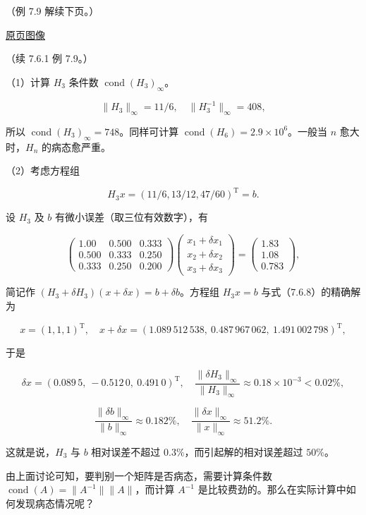 \documentclass[
  10pt,
  fontset=fandol]{ctexart}
\begin{document}
（例 7.9 解续下页。）

\href{../../source-images/pdf-208.jpeg}{原页图像}

（续 7.6.1 例 7.9。）

（1）计算 \(H_3\) 条件数 \(\operatorname{cond}(H_3)_\infty\)。

\[
\|H_3\|_\infty=11/6,\quad\|H_3^{-1}\|_\infty=408,
\]

所以 \(\operatorname{cond}(H_3)_\infty=748\)。同样可计算 \(\operatorname{cond}(H_6)=2.9\times10^6\)。一般当 \(n\) 愈大时，\(H_n\) 的病态愈严重。

（2）考虑方程组

\[
H_3x=(11/6,13/12,47/60)^{\mathrm T}=b.
\]

设 \(H_3\) 及 \(b\) 有微小误差（取三位有效数字），有

\[
\begin{pmatrix}
1.00&0.500&0.333\\
0.500&0.333&0.250\\
0.333&0.250&0.200
\end{pmatrix}
\begin{pmatrix}x_1+\delta x_1\\x_2+\delta x_2\\x_3+\delta x_3\end{pmatrix}
=\begin{pmatrix}1.83\\1.08\\0.783\end{pmatrix},
\tag{7.6.8}
\]

简记作 \((H_3+\delta H_3)(x+\delta x)=b+\delta b\)。方程组 \(H_3x=b\) 与式（7.6.8）的精确解为

\[
x=(1,1,1)^{\mathrm T},\quad
x+\delta x=(1.089\,512\,538,\ 0.487\,967\,062,\ 1.491\,002\,798)^{\mathrm T},
\]

于是

\[
\delta x=(0.089\,5,\ -0.512\,0,\ 0.491\,0)^{\mathrm T},\quad
\frac{\|\delta H_3\|_\infty}{\|H_3\|_\infty}\approx0.18\times10^{-3}<0.02\%,
\]

\[
\frac{\|\delta b\|_\infty}{\|b\|_\infty}\approx0.182\%,\quad
\frac{\|\delta x\|_\infty}{\|x\|_\infty}\approx51.2\%.
\]

这就是说，\(H_3\) 与 \(b\) 相对误差不超过 \(0.3\%\)，而引起解的相对误差超过 \(50\%\)。

由上面讨论可知，要判别一个矩阵是否病态，需要计算条件数 \(\operatorname{cond}(A)=\|A^{-1}\|\|A\|\)，而计算 \(A^{-1}\) 是比较费劲的。那么在实际计算中如何发现病态情况呢？
\end{document}
